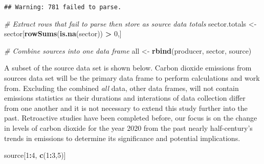 \documentclass[
]{article}
\newenvironment{Shaded}{\begin{snugshade}}{\end{snugshade}}
\newcommand{\CommentTok}[1]{\textcolor[rgb]{0.56,0.35,0.01}{\textit{#1}}}
\newcommand{\DecValTok}[1]{\textcolor[rgb]{0.00,0.00,0.81}{#1}}
\newcommand{\KeywordTok}[1]{\textcolor[rgb]{0.13,0.29,0.53}{\textbf{#1}}}
\newcommand{\NormalTok}[1]{#1}
\newcommand{\OperatorTok}[1]{\textcolor[rgb]{0.81,0.36,0.00}{\textbf{#1}}}
\newcommand{\StringTok}[1]{\textcolor[rgb]{0.31,0.60,0.02}{#1}}
\begin{document}
\begin{Shaded}
\end{Shaded}

\begin{verbatim}
## Warning: 781 failed to parse.
\end{verbatim}

\begin{Shaded}
\begin{Highlighting}[]
    \CommentTok{# Extract rows that fail to parse then store as source data totals}
\NormalTok{    sector.totals <-}\StringTok{ }\NormalTok{sector[}\KeywordTok{rowSums}\NormalTok{(}\KeywordTok{is.na}\NormalTok{(sector)) }\OperatorTok{>}\StringTok{ }\DecValTok{0}\NormalTok{,]}

\CommentTok{# Combine sources into one data frame}
\NormalTok{all <-}\StringTok{ }\KeywordTok{rbind}\NormalTok{(producer, sector, source) }
\end{Highlighting}
\end{Shaded}

A subset of the source data set is shown below. Carbon dioxide emissions
from sources data set will be the primary data frame to perform
calculations and work from. Excluding the combined \emph{all} data,
other data frames, will not contain emissions statistics as their
durations and interations of data collection differ from one another and
it is not necessary to extend this study further into the past.
Retroactive studies have been completed before, our focus is on the
change in levels of carbon dioxide for the year 2020 from the past
nearly half-century's trends in emissions to determine its significance
and potential implications.

\begin{Shaded}
\begin{Highlighting}[]
\NormalTok{source[}\DecValTok{1}\OperatorTok{:}\DecValTok{4}\NormalTok{, }\KeywordTok{c}\NormalTok{(}\DecValTok{1}\OperatorTok{:}\DecValTok{3}\NormalTok{,}\DecValTok{5}\NormalTok{)]}
\end{Highlighting}
\end{Shaded}
\end{document}
